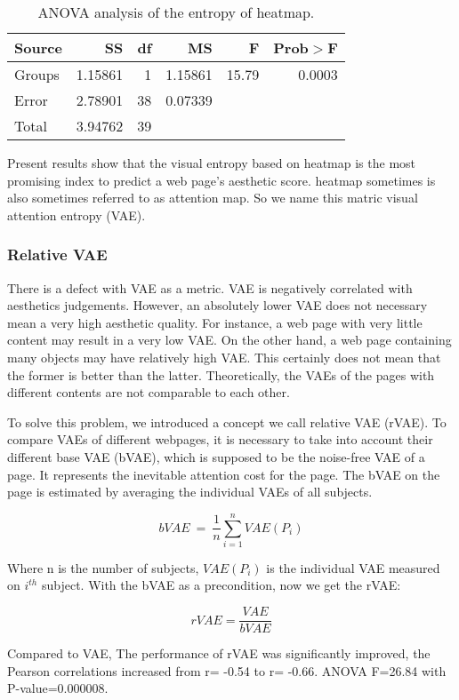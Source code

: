 \begin{table}[H]
\centering
\begin{tabular}{lrrrrr}
  Source&SS&df&MS&F&Prob$>$F\\ \hline
  Groups&1.15861&1&1.15861&15.79&0.0003\\
  Error&2.78901&38&0.07339&&\\
  Total&3.94762&39&&&\\
\end{tabular}
\caption{ANOVA analysis of the entropy of heatmap.}
\label{tab:ANOVA-vae-dw}
\end{table}

Present results show that the visual entropy based on heatmap is the most promising index to predict a web page's aesthetic score. heatmap sometimes is also sometimes referred to as attention map. So we name this matric visual attention entropy (VAE).

\subsubsection{Relative VAE}
There is a defect with VAE as a metric. VAE is negatively correlated with aesthetics judgements. However, an absolutely lower VAE does not necessary mean a very high aesthetic quality. For instance, a web page with very little content may result in a very low VAE. On the other hand, a web page containing many objects may have relatively high VAE. This certainly does not mean that the former is better than the latter. Theoretically, the VAEs of the pages with different contents are not comparable to each other.

To solve this problem, we introduced a concept we call relative VAE (rVAE). To compare VAEs of different webpages, it is necessary to take into account their different base VAE (bVAE), which is supposed to be the noise-free VAE of a page. It represents the inevitable attention cost for the page. The bVAE on the page is estimated by averaging the individual VAEs of all subjects.

$$bVAE~=~\frac{1}{n}\sum_{i=1}^n VAE(P_i)$$

Where n is the number of subjects, $VAE(P_i)$ is the individual VAE measured on $i^{th}$ subject.
With the bVAE as a precondition, now we get the rVAE:

\begin{equation}
rVAE = \frac{VAE}{bVAE}
\label{formula:rvae}
\end{equation}

Compared to VAE, The performance of rVAE was significantly improved, the Pearson correlations increased from r= -0.54 to r= -0.66. ANOVA F=26.84 with P-value=0.000008.

